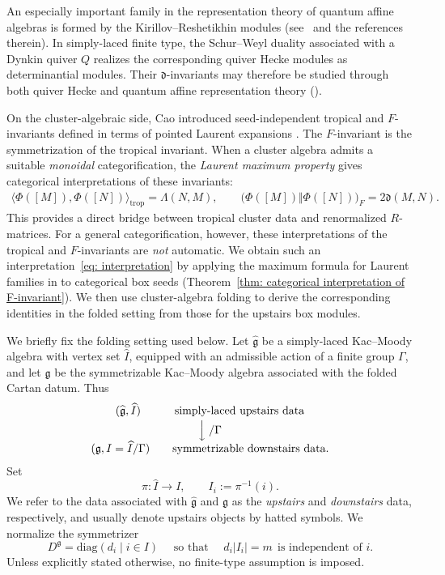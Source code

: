 \documentclass[12pt, leqno]{amsart}
\numberwithin{equation}{section}
\theoremstyle{plain}
\theoremstyle{definition}
\newcommand{\seteq}{\mathbin{:=}}
\newcommand{\g}{\mathfrak{g}}
\newcommand{\de}{\mathfrak{d}}
\newcommand{\hI}{\widehat{I}}
\newcommand{\hg}{{\widehat{\g}}}
\newcommand{\diag}{\mathrm{diag}}
\begin{document}
\smallskip

An especially important family in the  representation
theory of quantum affine algebras is formed by the Kirillov--Reshetikhin modules 
(see~\cite{Nak03KR,Her06KR,CH10Beyond} and the references therein).  
In simply-laced finite type, the Schur--Weyl duality associated with a
Dynkin quiver $Q$ realizes the corresponding quiver Hecke
modules as determinantial modules.  Their \(\de\)-invariants
may therefore be studied through both quiver Hecke and quantum
affine representation theory (\cite{KKOP23P}).

\smallskip

On the cluster-algebraic side, Cao introduced seed-independent
tropical and \(F\)-invariants defined in terms of pointed Laurent
expansions \cite{Cao23}.  The \(F\)-invariant is the
symmetrization of the tropical invariant.
When a cluster algebra admits a suitable \emph{monoidal}
categorification, the \emph{Laurent maximum property} gives
categorical interpretations of these invariants:
\begin{align}\label{eq: interpretation}
\bigl\langle\Phi([M]),\Phi([N])\bigr\rangle_{\mathrm{trop}}
=\Lambda(N,M),\qquad 
\bigl(\Phi([M])\Vert\Phi([N])\bigr)_F
=2\de(M,N).
\end{align}
This provides a direct bridge between tropical cluster data and
renormalized \(R\)-matrices.   For a general categorification, however,
these interpretations of the tropical and \(F\)-invariants are
\emph{not} automatic.  We
obtain such an interpretation~\eqref{eq: interpretation} by applying
the maximum formula for Laurent families in
\cite[Theorem~2.13]{KKOP26} to categorical box seeds
(Theorem~\ref{thm: categorical interpretation of F-invariant}). We then use cluster-algebra folding \cite{JO26}
to derive the corresponding identities in the folded setting
from those for the upstairs box modules. 

\medskip 

We briefly fix the folding setting used below.  Let \(\hg\) be a
simply-laced Kac--Moody algebra with vertex set \(\hI\), equipped
with an admissible action of a finite group \(\Gamma\), and let \(\g\)
be the symmetrizable Kac--Moody algebra associated with the folded
Cartan datum.  Thus
\begin{align} \label{eq: frame}
\begin{array}{c}
(\hg,\hI)\qquad \ \ \ \text{simply-laced upstairs data}
\\[2pt]
\Big\downarrow\;/\Gamma
\\[2pt]
(\g,I=\hI/\Gamma)\qquad\text{symmetrizable downstairs data}.
\end{array}
\end{align}
Set
\[
\pi:\hI\longrightarrow I,
\qquad
I_i\seteq\pi^{-1}(i).
\]
We refer to the data associated with \(\hg\) and \(\g\) as the
\emph{upstairs} and \emph{downstairs} data, respectively, and
usually denote upstairs objects by hatted symbols.  We normalize
the symmetrizer
\[
D^\g=\diag(d_i\mid i\in I)
\quad
\text{ so that }
\quad
d_i|I_i|=m \ \  \text{is independent of \(i\).}
\]
  Unless explicitly stated otherwise, no
finite-type assumption is imposed.
\end{document}

